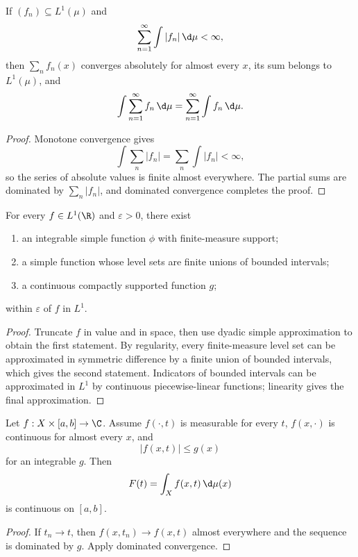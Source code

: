 \begin{thm}
If $(f_n)\subseteq L^1(\mu)$ and
\[
\sum_{n=1}^{\infty}\int|f_n|\,\d\mu<\infty,
\]
then $\sum_nf_n(x)$ converges absolutely for almost every $x$, its sum belongs to $L^1(\mu)$, and
\[
\int\sum_{n=1}^{\infty}f_n\,\d\mu
 =\sum_{n=1}^{\infty}\int f_n\,\d\mu.
\]
\end{thm}

\begin{proof}
Monotone convergence gives
\[
\int\sum_n|f_n|=\sum_n\int|f_n|<\infty,
\]
so the series of absolute values is finite almost everywhere. The partial sums are dominated by $\sum_n|f_n|$, and dominated convergence completes the proof.
\end{proof}

\begin{thm}[Approximation in $L^1(\R)$]
For every $f\in L^1(\R)$ and $\varepsilon>0$, there exist
\begin{enumerate}
  \item an integrable simple function $\phi$ with finite-measure support;
  \item a simple function whose level sets are finite unions of bounded intervals;
  \item a continuous compactly supported function $g$;
\end{enumerate}
within $\varepsilon$ of $f$ in $L^1$.
\end{thm}

\begin{proof}
Truncate $f$ in value and in space, then use dyadic simple approximation to obtain the first statement. By regularity, every finite-measure level set can be approximated in symmetric difference by a finite union of bounded intervals, which gives the second statement. Indicators of bounded intervals can be approximated in $L^1$ by continuous piecewise-linear functions; linearity gives the final approximation.
\end{proof}

\begin{thm}
Let $f:X\times[a,b]\to\C$. Assume $f(\cdot,t)$ is measurable for every $t$, $f(x,\cdot)$ is continuous for almost every $x$, and
\[
|f(x,t)|\leq g(x)
\]
for an integrable $g$. Then
\[
F(t)=\int_Xf(x,t)\,\d\mu(x)
\]
is continuous on $[a,b]$.
\end{thm}

\begin{proof}
If $t_n\to t$, then $f(x,t_n)\to f(x,t)$ almost everywhere and the sequence is dominated by $g$. Apply dominated convergence.
\end{proof}

